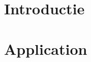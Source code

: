 \documentclass{report}
\begin{document}
\sffamily



\tableofcontents

\newpage

\chapter{Introductie} \label{introductie}


\newpage

\chapter{Application} \label{application}


\newpage

\printbibliography
\end{document}
